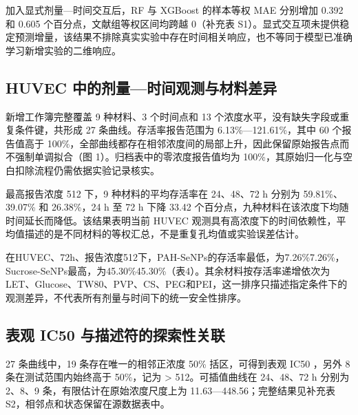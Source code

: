 \begin{table}[H]
\centering
\caption{固定 500 树预算的 General 到 SeNP 迁移对照。该对照采用预先指定参数，与表 2 的嵌套选择主分析分别解释。}
\label{tab:transfer_results}
\small

\end{table}

加入显式剂量—时间交互后，RF 与 XGBoost 的样本等权 MAE 分别增加 0.392 和 0.605 个百分点，文献组等权区间均跨越 0（补充表 S1）。显式交互项未提供稳定预测增量，该结果不排除真实实验中存在时间相关响应，也不等同于模型已准确学习新增实验的二维响应。

\subsection{HUVEC 中的剂量—时间观测与材料差异}

新增工作簿完整覆盖 9 种材料、3 个时间点和 13 个浓度水平，没有缺失字段或重复条件键，共形成 27 条曲线。存活率报告范围为 6.13\%—121.61\%，其中 60 个报告值高于 100\%，全部曲线都存在相邻浓度间的局部上升，因此保留原始报告点而不强制单调拟合（图 1）。归档表中的零浓度报告值均为 100\%，其原始归一化与空白扣除流程仍需依据实验记录核实。

最高报告浓度 512 下，9 种材料的平均存活率在 24、48、72 h 分别为 59.81\%、39.07\% 和 26.38\%，24 h 至 72 h 下降 33.42 个百分点，九种材料在该浓度下均随时间延长而降低。该结果表明当前 HUVEC 观测具有高浓度下的时间依赖性，平均值描述的是不同材料的等权汇总，不是重复孔均值或实验误差估计。

在HUVEC、72h、报告浓度512下，PAH-SeNPs的存活率最低，为\nobreakspace{}7.26\%7.26\%，Sucrose-SeNPs最高，为\nobreakspace{}45.30\%45.30\%（表4）。其余材料按存活率递增依次为LET、Glucose、TW80、PVP、CS、PEG和PEI，这一排序只描述指定条件下的观测差异，不代表所有剂量与时间下的统一安全性排序。

\begin{table}[H]
\centering
\caption{报告浓度 512 下的材料描述符与 HUVEC 存活率。按 72 h 存活率递增排列。}
\label{tab:huvec_materials}
\small

\end{table}

\subsection{表观 IC50 与描述符的探索性关联}

27 条曲线中，19 条存在唯一的相邻正浓度 50\% 括区，可得到表观 IC50 ，另外 8 条在测试范围内始终高于 50\%，记为 > 512。可插值曲线在 24、48、72 h 分别为 2、8、9 条，有限估计在原始浓度尺度上为 11.63—448.56；完整结果见补充表 S2，相邻点和状态保留在源数据表中。

